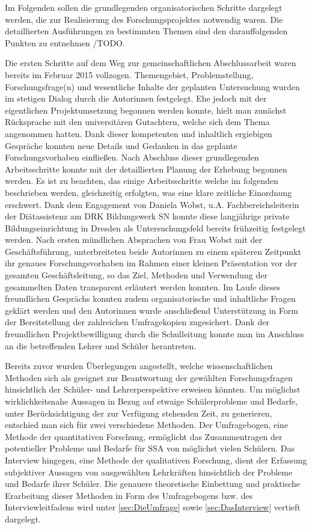 Im Folgenden sollen die grundlegenden organisatorischen Schritte dargelegt werden, die zur Realisierung des Forschungsprojektes notwendig waren. Die detaillierten Ausführungen zu bestimmten Themen sind den darauffolgenden Punkten zu entnehmen /TODO. 

Die ersten Schritte auf dem Weg zur gemeinschaftlichen Abschlussarbeit waren bereits im Februar 2015 vollzogen. Themengebiet, Problemstellung, Forschungsfrage(n) und wesentliche Inhalte der geplanten Untersuchung wurden im stetigen Dialog durch die Autorinnen festgelegt. Ehe jedoch mit der eigentlichen Projektumsetzung begonnen werden konnte, hielt man zunächst Rücksprache mit den universitären Gutachtern, welche sich dem Thema angenommen hatten. Dank dieser kompetenten und inhaltlich ergiebigen Gespräche konnten neue Details und Gedanken in das geplante Forschungsvorhaben einfließen. Nach Abschluss dieser grundlegenden Arbeitsschritte konnte mit der detaillierten Planung der Erhebung begonnen werden. 
Es ist zu beachten, das einige Arbeitsschritte welche im folgenden beschrieben werden, gleichzeitig erfolgten, was eine klare zeitliche Einordnung erschwert.
Dank dem Engagement von Daniela Wobst, u.A. Fachbereichsleiterin der Diätassistenz am DRK Bildungswerk SN konnte diese langjährige private Bildungseinrichtung in Dresden als Untersuchungsfeld bereits frühzeitig festgelegt werden. Nach ersten mündlichen Absprachen von Frau Wobst mit der Geschäftsführung, unterbreiteten beide Autorinnen zu einem späteren Zeitpunkt ihr genaues Forschungsvorhaben im Rahmen einer kleinen Präsentation vor der gesamten Geschäftsleitung, so das Ziel, Methoden und Verwendung der gesammelten Daten transparent erläutert werden konnten. Im Laufe dieses freundlichen Gesprächs konnten zudem organisatorische und inhaltliche Fragen geklärt werden und den Autorinnen wurde anschließend Unterstützung in Form der Bereitstellung der zahlreichen Umfragekopien zugesichert. Dank der freundlichen Projektbewilligung durch die Schulleitung konnte man im Anschluss an die betreffenden Lehrer und Schüler herantreten.

Bereits zuvor wurden Überlegungen angestellt, welche wissenschaftlichen Methoden sich als geeignet zur Beantwortung der gewählten Forschungsfragen hinsichtlich der Schüler- und  Lehrerperspektive erweisen könnten. Um möglichst wirklichkeitsnahe Aussagen in Bezug auf etwaige Schülerprobleme und Bedarfe, unter Berücksichtigung der zur Verfügung stehenden Zeit, zu generieren, entschied man sich für zwei verschiedene Methoden. Der Umfragebogen, eine Methode der quantitativen Forschung, ermöglicht das Zusammentragen der potentieller Probleme und Bedarfe für SSA von möglichst vielen Schülern. Das Interview hingegen, eine Methode der qualitativen Forschung, dient der  Erfassung subjektiver Aussagen von ausgewählten Lehrkräften hinsichtlich der Probleme und Bedarfe ihrer Schüler. Die genauere theoretische Einbettung und praktische Erarbeitung dieser Methoden in Form des Umfragebogens bzw. des Interviewleitfadens wird unter \ref{sec:DieUmfrage} sowie \ref{sec:DasInterview} vertieft dargelegt.

